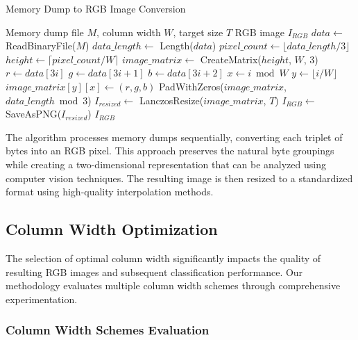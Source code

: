 \begin{algorithm}[!htbp]
\caption{Memory Dump to RGB Image Conversion}
\label{alg:rgb-conversion}
\begin{algorithmic}[1]
\Require Memory dump file $M$, column width $W$, target size $T$
\Ensure RGB image $I_{RGB}$
\State $data \leftarrow$ ReadBinaryFile($M$)
\State $data\_length \leftarrow$ Length($data$)
\State $pixel\_count \leftarrow \lfloor data\_length / 3 \rfloor$ 
\State $height \leftarrow \lceil pixel\_count / W \rceil$
\State $image\_matrix \leftarrow$ CreateMatrix($height$, $W$, 3)
    \State $r \leftarrow data[3i]$ 
    \State $g \leftarrow data[3i + 1]$ 
    \State $b \leftarrow data[3i + 2]$ 
    \State $x \leftarrow i \bmod W$ 
    \State $y \leftarrow \lfloor i / W \rfloor$ 
    \State $image\_matrix[y][x] \leftarrow (r, g, b)$ 
\EndFor
{} 
    \State PadWithZeros($image\_matrix$, $data\_length \bmod 3$)
\EndIf
\State $I_{resized} \leftarrow$ LanczosResize($image\_matrix$, $T$) 
\State $I_{RGB} \leftarrow$ SaveAsPNG($I_{resized}$) 
\Return $I_{RGB}$
\end{algorithmic}
\end{algorithm}

The algorithm processes memory dumps sequentially, converting each triplet of bytes into an RGB pixel. This approach preserves the natural byte groupings while creating a two-dimensional representation that can be analyzed using computer vision techniques. The resulting image is then resized to a standardized format using high-quality interpolation methods.

\subsection{Column Width Optimization}
\label{subsec:column-width}

The selection of optimal column width significantly impacts the quality of resulting RGB images and subsequent classification performance. Our methodology evaluates multiple column width schemes through comprehensive experimentation.

\subsubsection{Column Width Schemes Evaluation}

